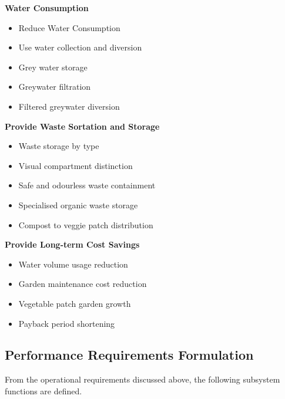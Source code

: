 \documentclass[a4paper,11pt,fleqn]{report}
\begin{document}
\textbf{Water Consumption}
\begin{itemize}
\item Reduce Water Consumption
\item Use water collection and diversion
\item Grey water storage 
\item Greywater filtration 
\item Filtered greywater diversion 
\end{itemize}
\medskip
\textbf{Provide Waste Sortation and Storage}
\begin{itemize}
\item Waste storage by type 
\item Visual compartment distinction 
\item Safe and odourless waste containment 
\item Specialised organic waste storage 
\item Compost to veggie patch distribution 
\end{itemize}
\medskip
\textbf{Provide Long-term Cost Savings}
\begin{itemize}
\item Water volume usage reduction
\item Garden maintenance cost reduction 
\item Vegetable patch garden growth 
\item Payback period shortening 
\end{itemize}


\subsection{Performance Requirements Formulation}
From the operational requirements discussed above, the following subsystem functions are defined. 
\end{document}
